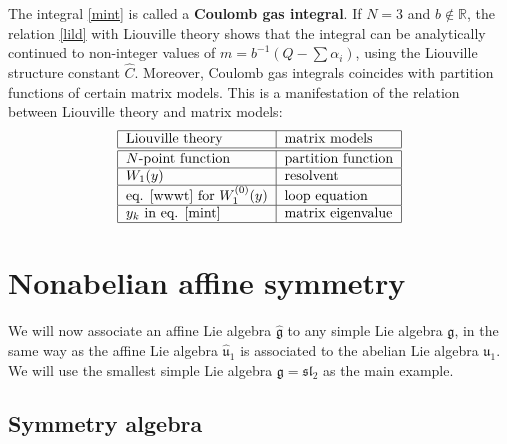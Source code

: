 \documentclass[12pt, a4paper, notitlepage, twoside]{report}
\numberwithin{equation}{section}
\theoremstyle{break}
\begin{document}
The integral \eqref{mint} is called a \textbf{\boldmath Coulomb gas integral}.
If $N=3$ and $b\notin \mathbb{R}$, the relation \eqref{lild} with Liouville theory shows that the integral can be analytically continued to non-integer values of $m=b^{-1}(Q-\sum\alpha_i)$, using the Liouville structure constant $\hat C$. 
Moreover, Coulomb gas integrals coincides with partition functions of certain matrix models.
This is a manifestation of the
relation between Liouville theory and matrix models:
\begin{align}
 \begin{tabular}{|l|l|}
  \hline
Liouville theory & matrix models
\\
\hline \hline
$N$-point function & partition function 
\\
\hline
$W_1(y)$  & resolvent
\\
\hline
eq. \eqref{wwwt} for $W_1^{(0)}(y)$ & loop equation 
\\
\hline
$y_k$ in eq. \eqref{mint} & matrix eigenvalue
\\
\hline
 \end{tabular}
\end{align}



\section{Nonabelian affine symmetry}

We will now associate an affine Lie algebra $\hat{\mathfrak{g}}$ to any simple Lie algebra $\mathfrak{g}$, in the same way as the  affine Lie algebra $\hat{\mathfrak{u}}_1$ is associated to the abelian Lie algebra $\mathfrak{u}_1$.
We will use the smallest simple Lie algebra $\mathfrak{g}=\mathfrak{sl}_2$ as the main example.

\subsection{Symmetry algebra}
\end{document}
